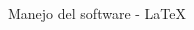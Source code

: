 \begin{frame}[t]{Manejo del software - \LaTeX}
\begin{columns}
\begin{column}{0.5\textwidth}
\begin{table}[h!]
\begin{tabular}{|l|r|}
\end{tabular}
\end{table}
\end{column}
\end{columns}
\end{frame}